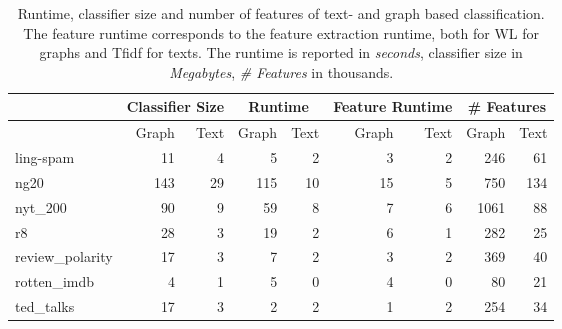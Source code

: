 \begin{table}[htb!]
    \centering
    \begin{tabular}{lrr|rr|rr|rr}
\toprule
        & \multicolumn{2}{c|}{Classifier Size} &  \multicolumn{2}{c|}{Runtime} &  \multicolumn{2}{c|}{Feature Runtime} &  \multicolumn{2}{c}{\# Features} \\
        \midrule
        &  Graph &  Text &  Graph &  Text & Graph &  Text  & Graph &  Text \\
        \midrule
ling-spam       & 11 & 4 & 5 & 2 & 3 & 2 & 246 & 61 \\
ng20            & 143 & 29 & 115 & 10 & 15 & 5 & 750 & 134 \\
nyt\_200         & 90 & 9 & 59 & 8 & 7 & 6 & 1061 & 88 \\
r8              & 28 & 3 & 19 & 2 & 6 & 1 & 282 & 25 \\
review\_polarity & 17 & 3 & 7 & 2 & 3 & 2 & 369 & 40 \\
rotten\_imdb     & 4 & 1 & 5 & 0 & 4 & 0 & 80 & 21 \\
ted\_talks       & 17 & 3 & 2 & 2 & 1 & 2 & 254 & 34 \\
        \bottomrule
    \end{tabular}
\caption[Table: Runtime, classifier size and \# features for graph- and text based classification.]{
    Runtime, classifier size and number of features of text- and graph based classification.
    The feature runtime corresponds to the feature extraction runtime, both for WL for graphs and Tfidf for texts.
    The runtime is reported in \textit{seconds}, classifier size in \textit{Megabytes}, \textit{\# Features} in thousands.
}
\label{table:runtime_and_classifier_size}
\end{table}

